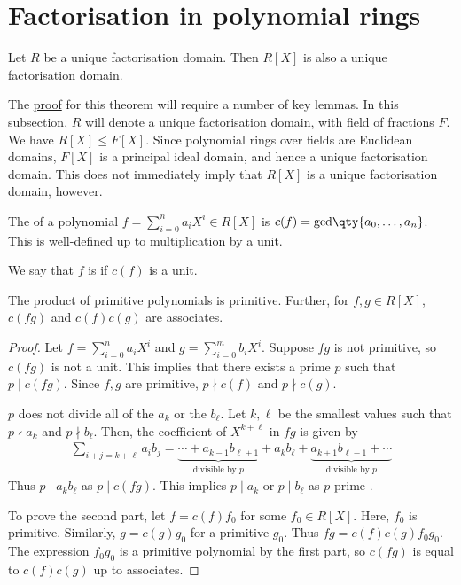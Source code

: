 \section{Factorisation in polynomial rings}
\begin{theorem} \label{thm:11.1}
	Let $R$ be a unique factorisation domain.
	Then $R[X]$ is also a unique factorisation domain.
\end{theorem}
The \hyperref[prf:11.1]{proof} for this theorem will require a number of key lemmas.
In this subsection, $R$ will denote a unique factorisation domain, with field of fractions $F$.
We have $R[X] \leq F[X]$.
Since polynomial rings over fields are Euclidean domains, $F[X]$ is a principal ideal domain, and hence a unique factorisation domain.
This does not immediately imply that $R[X]$ is a unique factorisation domain, however.

\begin{definition}[Content]
	The  of a polynomial $f = \sum_{i=0}^n a_i X^i \in R[X]$ is $c(f) = \mathrm{gcd}\qty{a_0, \dots, a_n}$.
	This is well-defined up to multiplication by a unit.
\end{definition}

\begin{definition}[Primitive]
	We say that $f$ is  if $c(f)$ is a unit.
\end{definition}

\begin{lemma} \label{lem:11.2}
	The product of primitive polynomials is primitive.
	Further, for $f, g \in R[X]$, $c(fg)$ and $c(f)c(g)$ are associates.
\end{lemma}

\begin{proof}
	Let $f = \sum_{i=0}^n a_i X^i$ and $g = \sum_{i=0}^m b_i X^i$.
	Suppose $fg$ is not primitive, so $c(fg)$ is not a unit.
	This implies that there exists a prime $p$ such that $p \mid c(fg)$.
	Since $f, g$ are primitive, $p \nmid c(f)$ and $p \nmid c(g)$.

	$p$ does not divide all of the $a_k$ or the $b_\ell$.
	Let $k, \ell$ be the smallest values such that $p \nmid a_k$ and $p \nmid b_\ell$.
	Then, the coefficient of $X^{k+\ell}$ in $fg$ is given by
	\begin{align*}
		\sum_{i+j=k+\ell} a_i b_j = \underbrace{\cdots + a_{k-1} b_{\ell+1}}_{\text{divisible by } p} + a_k b_\ell + \underbrace{a_{k+1} b_{\ell - 1} + \cdots}_{\text{divisible by } p}
	\end{align*}
	Thus $p \mid a_k b_\ell$ as $p \mid c(fg)$.
	This implies $p \mid a_k$ or $p \mid b_\ell$ as $p$ prime \Lightning.

	To prove the second part, let $f = c(f) f_0$ for some $f_0 \in R[X]$.
	Here, $f_0$ is primitive.
	Similarly, $g = c(g) g_0$ for a primitive $g_0$.
	Thus $fg = c(f) c(g) f_0 g_0$.
	The expression $f_0 g_0$ is a primitive polynomial by the first part, so $c(fg)$ is equal to $c(f) c(g)$ up to associates.
\end{proof}

